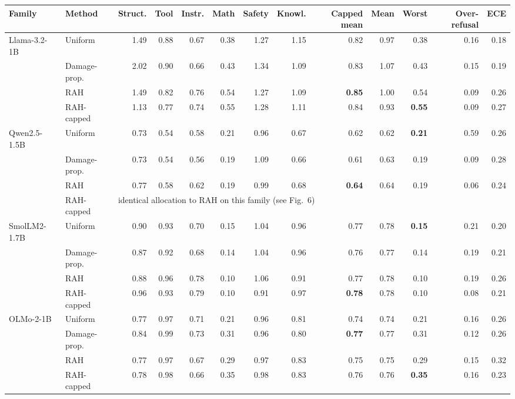 \begin{tabular}{llrrrrrrrrrrr}
\toprule
Family & Method & Struct. & Tool & Instr. & Math & Safety & Knowl. & Capped mean & Mean & Worst & Over-refusal & ECE \\
\midrule
Llama-3.2-1B & Uniform & 1.49 & 0.88 & 0.67 & 0.38 & 1.27 & 1.15 & 0.82 & 0.97 & 0.38 & 0.16 & 0.18 \\
 & Damage-prop. & 2.02 & 0.90 & 0.66 & 0.43 & 1.34 & 1.09 & 0.83 & 1.07 & 0.43 & 0.15 & 0.19 \\
 & RAH & 1.49 & 0.82 & 0.76 & 0.54 & 1.27 & 1.09 & \textbf{0.85} & 1.00 & 0.54 & 0.09 & 0.26 \\
 & RAH-capped & 1.13 & 0.77 & 0.74 & 0.55 & 1.28 & 1.11 & 0.84 & 0.93 & \textbf{0.55} & 0.09 & 0.27 \\
\midrule
Qwen2.5-1.5B & Uniform & 0.73 & 0.54 & 0.58 & 0.21 & 0.96 & 0.67 & 0.62 & 0.62 & \textbf{0.21} & 0.59 & 0.26 \\
 & Damage-prop. & 0.73 & 0.54 & 0.56 & 0.19 & 1.09 & 0.66 & 0.61 & 0.63 & 0.19 & 0.09 & 0.28 \\
 & RAH & 0.77 & 0.58 & 0.62 & 0.19 & 0.99 & 0.68 & \textbf{0.64} & 0.64 & 0.19 & 0.06 & 0.24 \\
 & RAH-capped & \multicolumn{11}{l}{identical allocation to RAH on this family (see Fig.~6)} \\
\midrule
SmolLM2-1.7B & Uniform & 0.90 & 0.93 & 0.70 & 0.15 & 1.04 & 0.96 & 0.77 & 0.78 & \textbf{0.15} & 0.21 & 0.20 \\
 & Damage-prop. & 0.87 & 0.92 & 0.68 & 0.14 & 1.04 & 0.96 & 0.76 & 0.77 & 0.14 & 0.19 & 0.21 \\
 & RAH & 0.88 & 0.96 & 0.78 & 0.10 & 1.06 & 0.91 & 0.77 & 0.78 & 0.10 & 0.19 & 0.26 \\
 & RAH-capped & 0.96 & 0.93 & 0.79 & 0.10 & 0.91 & 0.97 & \textbf{0.78} & 0.78 & 0.10 & 0.08 & 0.21 \\
\midrule
OLMo-2-1B & Uniform & 0.77 & 0.97 & 0.71 & 0.21 & 0.96 & 0.81 & 0.74 & 0.74 & 0.21 & 0.16 & 0.26 \\
 & Damage-prop. & 0.84 & 0.99 & 0.73 & 0.31 & 0.96 & 0.80 & \textbf{0.77} & 0.77 & 0.31 & 0.12 & 0.26 \\
 & RAH & 0.77 & 0.97 & 0.67 & 0.29 & 0.97 & 0.83 & 0.75 & 0.75 & 0.29 & 0.15 & 0.32 \\
 & RAH-capped & 0.78 & 0.98 & 0.66 & 0.35 & 0.98 & 0.83 & 0.76 & 0.76 & \textbf{0.35} & 0.16 & 0.23 \\
\bottomrule
\end{tabular}
